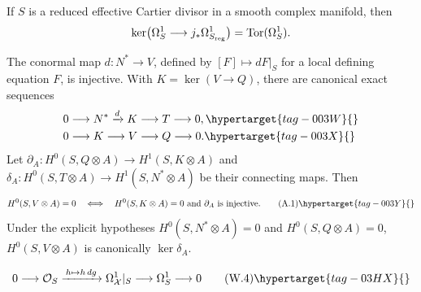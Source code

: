 
\begin{lemma}
\hypertarget{tag-03IF}{}\label{wbII:lem:torsion-identification}


If $S$ is a reduced effective Cartier divisor in a smooth complex manifold,
then
\[
\ker\bigl(\Omega^1_S\longrightarrow j_*\Omega^1_{S_{\rm reg}}\bigr)
  =\operatorname{Tor}(\Omega^1_S).
\]
\end{lemma}

\begin{proposition}\hypertarget{tag-01AD}{}\label{cdp:st:A.1.1}

\label{wbII:prop:criterion}\label{wbII:prop:filtration}\label{wbII:lem:conormal}\label{wbII:lem:conormal-injective}\label{wbII:prop:missing-global-section-criterion}\label{wbII:prop:missing-cotangent-filtration}
The conormal map $d:N^*\to V$, defined by $[F]\mapsto dF|_S$ for a local defining equation $F$, is injective. With $K=\ker(V\to Q)$, there are canonical exact sequences
\begin{align}
0&\longrightarrow N^*\xrightarrow{d}K\longrightarrow T\longrightarrow0,
\hypertarget{tag-003W}{}\label{cdp:A:filtration1}\\
0&\longrightarrow K\longrightarrow V\longrightarrow Q\longrightarrow0.
\hypertarget{tag-003X}{}\label{cdp:A:filtration2}
\end{align}
Let $\partial_A:H^0(S,Q\otimes A)\to H^1(S,K\otimes A)$ and $\delta_A:H^0(S,T\otimes A)\to H^1(S,N^*\otimes A)$ be their connecting maps. Then
\[
 H^0(S,V\otimes A)=0
 \quad\Longleftrightarrow\quad
 H^0(S,K\otimes A)=0\ \hbox{and}\ \partial_A\hbox{ is injective}.
\tag{A.1}\hypertarget{tag-003Y}{}\label{cdp:eq:A.1}
\]
Under the explicit hypotheses $H^0(S,N^*\otimes A)=0$ and $H^0(S,Q\otimes A)=0$, $H^0(S,V\otimes A)$ is canonically $\ker\delta_A$.
\end{proposition}

\[
0\longrightarrow\mathcal O_S
\xrightarrow{\,h\mapsto h\,dg\,}
\Omega^1_{\mathcal X}|_S\longrightarrow\Omega^1_S\longrightarrow0
\tag{W.4}\hypertarget{tag-03HX}{}\label{wbII:eq:W:5.4}
\]

